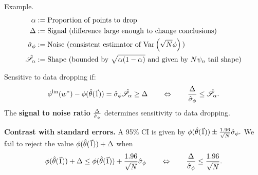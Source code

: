 
\begin{frame}[t]{Example.}
%
\vspace{-2em}
\begin{align*}
%
\alpha :={}& \textrm{Proportion of points to drop}\\
\Delta :={}& \textrm{Signal (difference large enough to change conclusions)}\\
\noise :={}& \textrm{Noise (consistent estimator of }
    \var{}{\sqrt{N} \thetafun}\textrm{)}\\
\shape :={}& \textrm{Shape (bounded by }
    \sqrt{\alpha(1-\alpha)}\textrm{ and given by }
    N\infl_n\textrm{ tail shape)}
%
\end{align*}
%
\hrulefill

Sensitive to data dropping if:
%
\begin{align*}
%
\thetafunlin(\w^*) - \thetafun(\thetahat(\onevec))  =
    \noise \shape \ge \Delta
\quad\quad
\Leftrightarrow
\quad\quad
\frac{\Delta}{\noise} \le \shape.
%
\end{align*}
%
The \textbf{signal to noise ratio} $\frac{\Delta}{\hat\sigma_{\phi}}$
determines sensitivity to data dropping.

\hrulefill

\textbf{Contrast with standard errors.}  A 95\% CI is given by
%
%
$
\phi(\hat{\theta}(\vec{1})) \pm \frac{1.96}{\sqrt{N}} \hat\sigma_{\phi}.
$
%
%
We fail to reject the value
$\phi(\hat{\theta}(\vec{1})) + \Delta$ when
%
\begin{align*}
%
\thetafun(\thetahat(\onevec)) + \Delta \le
\thetafun(\thetahat(\onevec)) + \frac{1.96}{\sqrt{N}} \noise
\quad\quad
\Leftrightarrow
\quad\quad
\frac{\Delta}{\noise} \le \frac{1.96}{\sqrt{N}}.
%
\end{align*}
%
\end{frame}



